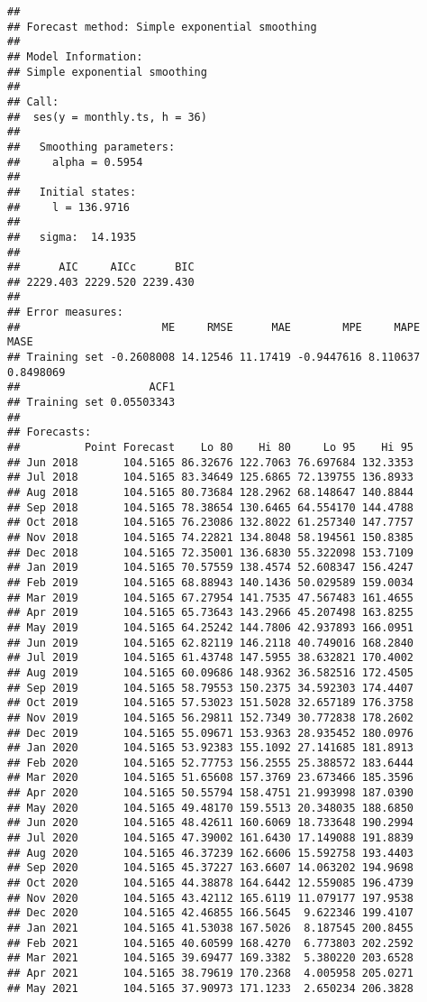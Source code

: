 \documentclass[
]{article}
\begin{document}
\begin{verbatim}
## 
## Forecast method: Simple exponential smoothing
## 
## Model Information:
## Simple exponential smoothing 
## 
## Call:
##  ses(y = monthly.ts, h = 36) 
## 
##   Smoothing parameters:
##     alpha = 0.5954 
## 
##   Initial states:
##     l = 136.9716 
## 
##   sigma:  14.1935
## 
##      AIC     AICc      BIC 
## 2229.403 2229.520 2239.430 
## 
## Error measures:
##                      ME     RMSE      MAE        MPE     MAPE      MASE
## Training set -0.2608008 14.12546 11.17419 -0.9447616 8.110637 0.8498069
##                    ACF1
## Training set 0.05503343
## 
## Forecasts:
##          Point Forecast    Lo 80    Hi 80     Lo 95    Hi 95
## Jun 2018       104.5165 86.32676 122.7063 76.697684 132.3353
## Jul 2018       104.5165 83.34649 125.6865 72.139755 136.8933
## Aug 2018       104.5165 80.73684 128.2962 68.148647 140.8844
## Sep 2018       104.5165 78.38654 130.6465 64.554170 144.4788
## Oct 2018       104.5165 76.23086 132.8022 61.257340 147.7757
## Nov 2018       104.5165 74.22821 134.8048 58.194561 150.8385
## Dec 2018       104.5165 72.35001 136.6830 55.322098 153.7109
## Jan 2019       104.5165 70.57559 138.4574 52.608347 156.4247
## Feb 2019       104.5165 68.88943 140.1436 50.029589 159.0034
## Mar 2019       104.5165 67.27954 141.7535 47.567483 161.4655
## Apr 2019       104.5165 65.73643 143.2966 45.207498 163.8255
## May 2019       104.5165 64.25242 144.7806 42.937893 166.0951
## Jun 2019       104.5165 62.82119 146.2118 40.749016 168.2840
## Jul 2019       104.5165 61.43748 147.5955 38.632821 170.4002
## Aug 2019       104.5165 60.09686 148.9362 36.582516 172.4505
## Sep 2019       104.5165 58.79553 150.2375 34.592303 174.4407
## Oct 2019       104.5165 57.53023 151.5028 32.657189 176.3758
## Nov 2019       104.5165 56.29811 152.7349 30.772838 178.2602
## Dec 2019       104.5165 55.09671 153.9363 28.935452 180.0976
## Jan 2020       104.5165 53.92383 155.1092 27.141685 181.8913
## Feb 2020       104.5165 52.77753 156.2555 25.388572 183.6444
## Mar 2020       104.5165 51.65608 157.3769 23.673466 185.3596
## Apr 2020       104.5165 50.55794 158.4751 21.993998 187.0390
## May 2020       104.5165 49.48170 159.5513 20.348035 188.6850
## Jun 2020       104.5165 48.42611 160.6069 18.733648 190.2994
## Jul 2020       104.5165 47.39002 161.6430 17.149088 191.8839
## Aug 2020       104.5165 46.37239 162.6606 15.592758 193.4403
## Sep 2020       104.5165 45.37227 163.6607 14.063202 194.9698
## Oct 2020       104.5165 44.38878 164.6442 12.559085 196.4739
## Nov 2020       104.5165 43.42112 165.6119 11.079177 197.9538
## Dec 2020       104.5165 42.46855 166.5645  9.622346 199.4107
## Jan 2021       104.5165 41.53038 167.5026  8.187545 200.8455
## Feb 2021       104.5165 40.60599 168.4270  6.773803 202.2592
## Mar 2021       104.5165 39.69477 169.3382  5.380220 203.6528
## Apr 2021       104.5165 38.79619 170.2368  4.005958 205.0271
## May 2021       104.5165 37.90973 171.1233  2.650234 206.3828
\end{verbatim}
\end{document}
